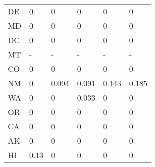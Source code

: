 \begin{table}[ht!]
\begin{tabular}{llllll}
DE          & 0               & 0              & 0               & 0                & 0               \\
MD          & 0               & 0              & 0               & 0                & 0               \\
DC          & 0               & 0              & 0               & 0                & 0               \\
MT          & -               & -              & -               & -                & -               \\
CO          & 0               & 0              & 0               & 0                & 0               \\
NM          & 0               & 0.094          & 0.091           & 0.143            & 0.185           \\
WA          & 0               & 0              & 0.033           & 0                & 0               \\
OR          & 0               & 0              & 0               & 0                & 0               \\
CA          & 0               & 0              & 0               & 0                & 0               \\
AK          & 0               & 0              & 0               & 0                & 0               \\
HI          & 0.13            & 0              & 0               & 0                & 0 \\
\hline
\end{tabular}
\end{table}